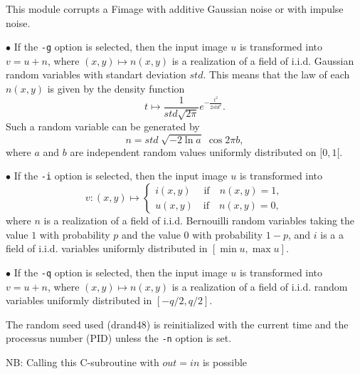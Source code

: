 This module corrupts a Fimage with additive Gaussian noise
or with impulse noise. 

\medskip

$\bullet$ If the \verb+-g+ option is selected, then the
input image $u$ is transformed into $v = u+n$, where $(x,y)\mapsto n(x,y)$
is a realization of a 
field of i.i.d. Gaussian random variables with standart deviation
$std$. This means that the law of each $n(x,y)$ is given by the density
function 
$$t\mapsto \frac{1}{std \sqrt{2 \pi}} e^{-\frac{t^2}{2 std ^2}}.$$
Such a random variable can be generated by
$$n = std \; \sqrt{-2\ln a} \; \cos 2\pi b,$$
where $a$ and $b$ are independent random values uniformly distributed on
$[0,1[$.


\medskip 

$\bullet$ If the \verb+-i+ option is selected, then the
input image $u$ is transformed into 
$$v : (x,y) \mapsto \left\{ \begin{array}{l}
i(x,y) \;\quad\mbox{if}\quad n(x,y)=1,\\
u(x,y) \quad\mbox{if}\quad n(x,y)=0,
\end{array} \right.$$
where $n$ is a realization of a 
field of i.i.d. Bernouilli random variables taking 
the value $1$ with probability $p$ and the value $0$ with probability $1-p$,
and $i$ is a a field of i.i.d. variables uniformly distributed
in $[\min u, \max u]$.

\medskip 

$\bullet$ If the \verb+-q+ option is selected, then the
input image $u$ is transformed into $v = u+n$, where $(x,y)\mapsto n(x,y)$
is a realization of a field of i.i.d. random variables uniformly
distributed in $[-q/2,q/2]$.

\medskip

The random seed used ({\sf drand48}) is reinitialized with the current time
and the processus number (PID) unless the \verb+-n+ option is set.

\medskip

NB: Calling this C-subroutine with $out=in$ is possible 
